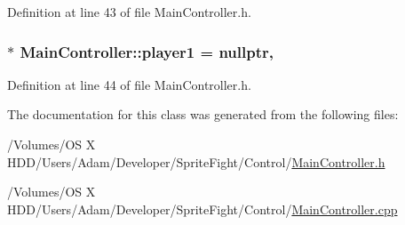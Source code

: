 Definition at line 43 of file Main\-Controller.\-h.

\hypertarget{class_main_controller_adfc74b59bd82472bd38642e7fa8fd723}{
\subsubsection[{player1}]{ $\ast$ Main\-Controller\-::player1 = nullptr\hspace{0.3cm}{\ttfamily [static]}, {\ttfamily [protected]}}}\label{class_main_controller_adfc74b59bd82472bd38642e7fa8fd723}


Definition at line 44 of file Main\-Controller.\-h.



The documentation for this class was generated from the following files\-:\begin{DoxyCompactItemize}
\item 
/\-Volumes/\-O\-S X H\-D\-D/\-Users/\-Adam/\-Developer/\-Sprite\-Fight/\-Control/\hyperlink{_main_controller_8h}{Main\-Controller.\-h}\item 
/\-Volumes/\-O\-S X H\-D\-D/\-Users/\-Adam/\-Developer/\-Sprite\-Fight/\-Control/\hyperlink{_main_controller_8cpp}{Main\-Controller.\-cpp}\end{DoxyCompactItemize}
